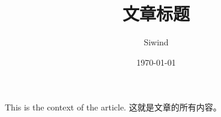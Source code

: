 \documentclass[UTF8]{ctexart}
\title{文章标题}
\author{Siwind}
\date{\today}
\begin{document}
    \maketitle
    This is the context of the article.
    这就是文章的所有内容。
    
\end{document}
